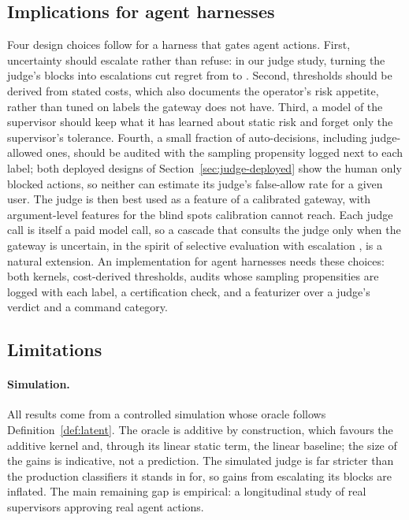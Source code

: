 \documentclass[11pt]{article}
\begin{document}
\subsection{Implications for agent harnesses}\label{sec:practice}

Four design choices follow for a harness that gates agent actions. First,
uncertainty should escalate rather than refuse: in our judge study, turning
the judge's blocks into escalations cut regret from \jrJudgeOnlyRegret{} to
\jrJudgeEscalateRegret. Second, thresholds should be derived from stated costs,
which also documents the operator's risk appetite, rather than tuned on labels
the gateway does not have. Third, a model of the supervisor should keep what
it has learned about static risk and forget only the supervisor's tolerance.
Fourth, a small fraction of auto-decisions, including judge-allowed ones,
should be audited with the sampling propensity logged next to each label;
both deployed designs of Section~\ref{sec:judge-deployed} show the human only
blocked actions, so neither can estimate its judge's false-allow rate for a
given user. The judge is then best used as a feature of a calibrated gateway,
with argument-level features for the blind spots calibration cannot reach.
Each judge call is itself a paid model call, so a cascade that consults the
judge only when the gateway is uncertain, in the spirit of selective
evaluation with escalation \citep{jung2025trust}, is a natural extension. An
implementation for agent harnesses needs these choices: both kernels,
cost-derived thresholds, audits whose sampling propensities are logged with
each label, a certification check, and a featurizer over a judge's verdict and
a command category.

\subsection{Limitations}\label{sec:limitations}

\paragraph{Simulation.} All results come from a controlled simulation whose
oracle follows Definition~\ref{def:latent}. The oracle is additive by
construction, which favours the additive kernel and, through its linear
static term, the linear baseline; the size of the gains is indicative, not a
prediction. The simulated judge is far stricter than the production
classifiers it stands in for, so gains from escalating its blocks are
inflated. The main remaining gap is empirical: a longitudinal study of real
supervisors approving real agent actions.
\end{document}
